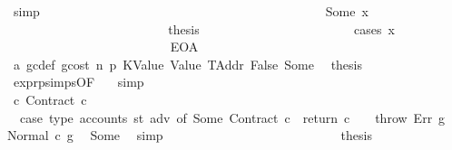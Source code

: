 \begin{isabellebody}
\ simp\isanewline
\ \ \ \ \ \ \ \ \ \ \ \ \ \ \ \ \ \ \ \ \isamarkupfalse%
\isanewline
\ \ \ \ \ \ \ \ \ \ \ \ \ \ \ \ \ \ \ \ \ \ \isamarkupfalse%
\ {\isacharparenleft}{\kern0pt}Some\ x{}{\isacharparenright}{\kern0pt}\isanewline
\ \ \ \ \ \ \ \ \ \ \ \ \ \ \ \ \ \ \ \ \ \ \isamarkupfalse%
\ \isamarkupfalse%
\ {\isacharquery}{\kern0pt}thesis\isanewline
\ \ \ \ \ \ \ \ \ \ \ \ \ \ \ \ \ \ \ \ \ \ \isamarkupfalse%
\ {\isacharparenleft}{\kern0pt}cases\ x{}{\isacharparenright}{\kern0pt}\isanewline
\ \ \ \ \ \ \ \ \ \ \ \ \ \ \ \ \ \ \ \ \ \ \ \ \isamarkupfalse%
\ EOA\isanewline
\ \ \ \ \ \ \ \ \ \ \ \ \ \ \ \ \ \ \ \ \ \ \ \ \isamarkupfalse%
\ a{}\ gc{\isacharunderscore}{\kern0pt}def\ gcost\ n\ p{}\ KValue\ Value\ TAddr\ False\ Some\ \isamarkupfalse%
\ {\isacharquery}{\kern0pt}thesis\ \isamarkupfalse%
\ expr{\isachardot}{\kern0pt}psimps{\isacharparenleft}{\kern0pt}{}{}{\isacharparenright}{\kern0pt}{\isacharbrackleft}{\kern0pt}OF\ {}{}{\isacharparenleft}{\kern0pt}{}{\isacharparenright}{\kern0pt}{\isacharbrackright}{\kern0pt}\ \isamarkupfalse%
\ simp\isanewline
\ \ \ \ \ \ \ \ \ \ \ \ \ \ \ \ \ \ \ \ \ \ \isamarkupfalse%
\isanewline
\ \ \ \ \ \ \ \ \ \ \ \ \ \ \ \ \ \ \ \ \ \ \ \ \isamarkupfalse%
\ c{\isacharcolon}{\kern0pt}\ {\isacharparenleft}{\kern0pt}Contract\ c{\isacharparenright}{\kern0pt}\isanewline
\ \ \ \ \ \ \ \ \ \ \ \ \ \ \ \ \ \ \ \ \ \ \ \ \isamarkupfalse%
\ \isamarkupfalse%
\ {}{\isacharcolon}{\kern0pt}\ {\isachardoublequoteopen}{\isacharparenleft}{\kern0pt}case\ type\ {\isacharparenleft}{\kern0pt}accounts\ st\ adv{\isacharparenright}{\kern0pt}\ of\ Some\ {\isacharparenleft}{\kern0pt}Contract\ c{\isacharparenright}{\kern0pt}\ {\isasymRightarrow}\ return\ c\ {\isacharbar}{\kern0pt}\ {\isacharunderscore}{\kern0pt}\ {\isasymRightarrow}\ throw\ Err{\isacharparenright}{\kern0pt}\ g{\isacharprime}{\kern0pt}\ {\isacharequal}{\kern0pt}\ Normal\ {\isacharparenleft}{\kern0pt}c{\isacharcomma}{\kern0pt}\ g{\isacharprime}{\kern0pt}{\isacharparenright}{\kern0pt}{\isachardoublequoteclose}\ \isamarkupfalse%
\ Some\ \isamarkupfalse%
\ simp\isanewline
\ \ \ \ \ \ \ \ \ \ \ \ \ \ \ \ \ \ \ \ \ \ \ \ \isamarkupfalse%
\ \isamarkupfalse%
\ {\isacharquery}{\kern0pt}thesis\isanewline

\end{isabellebody}
